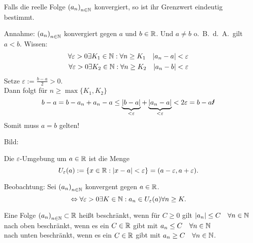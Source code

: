\documentclass[../ana1.tex]{subfiles}
\begin{document}
\begin{satz}
	Falls die reelle Folge \({(a_n)}_{n\in\mathbb{N}}\) konvergiert, so ist ihr Grenzwert eindeutig bestimmt.
\end{satz}
\begin{bew}
	Annahme: \({(a_n)}_{n\in\mathbb{N}}\) konvergiert gegen \(a\) und \(b\in\mathbb{R} \). Und \(a\neq b\) o.\ B.\ d.\ A.\ gilt \(a<b\).
	Wissen: 
	\begin{align*}
		\forall \varepsilon>0\exists K_1\in\mathbb{N}: \forall n\geq K_1 \quad |a_n -a| <\varepsilon \\
		\forall \varepsilon>0\exists K_2\in\mathbb{N}: \forall n\geq K_2 \quad |a_n -b| <\varepsilon
	\end{align*}
	Setze \(\varepsilon:=\frac{b-a}{2} >0\).\\
	Dann folgt für \(n\geq \max \{K_1,K_2\} \)
	\[b-a = b-a_n + a_n -a \leq \underbrace{|b-a|}_{<\varepsilon} + \underbrace{|a_n-a|}_{<\varepsilon} < 2\varepsilon = b-a \text{\Lightning}\]
	Somit muss \(a=b\) gelten!
\end{bew}
Bild:\\
\begin{center}
\end{center}
\begin{defi}
	Die \(\varepsilon \)-Umgebung um \(a\in\mathbb{R} \) ist die Menge
	\[U_\varepsilon(a):= \{x\in\mathbb{R}: |x-a| <\varepsilon \} = (a-\varepsilon, a+\varepsilon).\]
\end{defi}
Beobachtung: Sei \({(a_n)}_{n\in\mathbb{N}}\) konvergent gegen \(a\in\mathbb{R} \).
\[\Leftrightarrow \forall\varepsilon >0 \exists K\in\mathbb{N}: a_n \in U_\varepsilon(a) \forall n\geq K.\]
\begin{defi}
	Eine Folge \({(a_n)}_{n\in\mathbb{N}} \subset \mathbb{R} \) heißt beschränkt, wenn für \(C\geq 0\) gilt \(|a_n|\leq C \quad \forall n\in\mathbb{N} \) \\
	nach oben beschränkt, wenn es ein \(C\in\mathbb{R} \) gibt mit \(a_n\leq C \quad \forall n\in\mathbb{N} \) \\
	nach unten beschränkt, wenn es ein \(C\in\mathbb{R} \) gibt mit \(a_n\geq C \quad \forall n\in\mathbb{N} \).
\end{defi}
\end{document}

